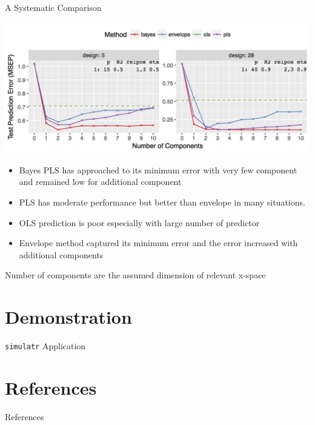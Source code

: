 \documentclass[ignorenonframetext,]{beamer}
\newif\ifbibliography
\providecommand{\tightlist}{%
\setlength{\itemsep}{0pt}\setlength{\parskip}{0pt}}
\begin{document}
\begin{frame}{A Systematic Comparison}

\includegraphics[width=0.6\linewidth]{images/prediction-error-selected}

\hypertarget{left}{}
\begin{itemize}
\tightlist
\item
  Bayes PLS has approached to its minimum error with very few component
  and remained low for additional component
\item
  PLS has moderate performance but better than envelope in many
  situations.
\end{itemize}

\hypertarget{right}{}
\begin{itemize}
\tightlist
\item
  OLS prediction is poor especially with large number of predictor
\item
  Envelope method captured its minimum error and the error increased
  with additional components
\end{itemize}

\begin{block}{Number of components are the assumed dimension of relevant
x-space}

\end{block}

\end{frame}

\section{Demonstration}\label{demonstration}

\begin{frame}{\texttt{simulatr} Application}

\end{frame}

\section{}\label{section}

\section{References}\label{references}

\begin{frame}{References}

\end{frame}

\begin{frame}[allowframebreaks]{}
\bibliographytrue

\end{frame}
\end{document}
